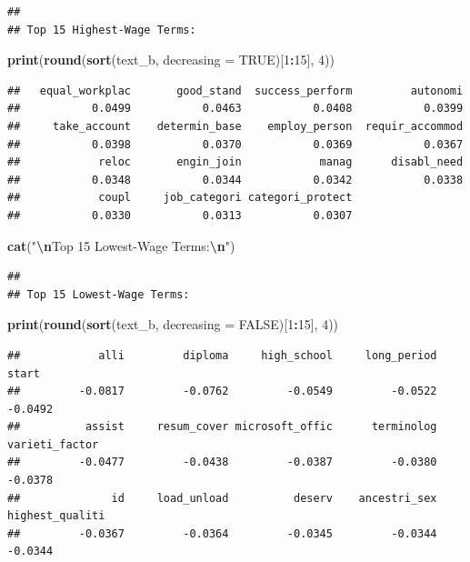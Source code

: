 \documentclass[
]{article}
\newenvironment{Shaded}{\begin{snugshade}}{\end{snugshade}}
\newcommand{\AttributeTok}[1]{\textcolor[rgb]{0.13,0.29,0.53}{#1}}
\newcommand{\ConstantTok}[1]{\textcolor[rgb]{0.56,0.35,0.01}{#1}}
\newcommand{\DecValTok}[1]{\textcolor[rgb]{0.00,0.00,0.81}{#1}}
\newcommand{\FunctionTok}[1]{\textcolor[rgb]{0.13,0.29,0.53}{\textbf{#1}}}
\newcommand{\NormalTok}[1]{#1}
\newcommand{\SpecialCharTok}[1]{\textcolor[rgb]{0.81,0.36,0.00}{\textbf{#1}}}
\newcommand{\StringTok}[1]{\textcolor[rgb]{0.31,0.60,0.02}{#1}}
\begin{document}
\begin{verbatim}
## 
## Top 15 Highest-Wage Terms:
\end{verbatim}

\begin{Shaded}
\begin{Highlighting}[]
\FunctionTok{print}\NormalTok{(}\FunctionTok{round}\NormalTok{(}\FunctionTok{sort}\NormalTok{(text\_b, }\AttributeTok{decreasing =} \ConstantTok{TRUE}\NormalTok{)[}\DecValTok{1}\SpecialCharTok{:}\DecValTok{15}\NormalTok{], }\DecValTok{4}\NormalTok{))}
\end{Highlighting}
\end{Shaded}

\begin{verbatim}
##   equal_workplac       good_stand  success_perform         autonomi 
##           0.0499           0.0463           0.0408           0.0399 
##     take_account    determin_base    employ_person  requir_accommod 
##           0.0398           0.0370           0.0369           0.0367 
##            reloc       engin_join            manag      disabl_need 
##           0.0348           0.0344           0.0342           0.0338 
##            coupl     job_categori categori_protect 
##           0.0330           0.0313           0.0307
\end{verbatim}

\begin{Shaded}
\begin{Highlighting}[]
\FunctionTok{cat}\NormalTok{(}\StringTok{"}\SpecialCharTok{\textbackslash{}n}\StringTok{Top 15 Lowest{-}Wage Terms:}\SpecialCharTok{\textbackslash{}n}\StringTok{"}\NormalTok{)}
\end{Highlighting}
\end{Shaded}

\begin{verbatim}
## 
## Top 15 Lowest-Wage Terms:
\end{verbatim}

\begin{Shaded}
\begin{Highlighting}[]
\FunctionTok{print}\NormalTok{(}\FunctionTok{round}\NormalTok{(}\FunctionTok{sort}\NormalTok{(text\_b, }\AttributeTok{decreasing =} \ConstantTok{FALSE}\NormalTok{)[}\DecValTok{1}\SpecialCharTok{:}\DecValTok{15}\NormalTok{], }\DecValTok{4}\NormalTok{))}
\end{Highlighting}
\end{Shaded}

\begin{verbatim}
##            alli         diploma     high_school     long_period           start 
##         -0.0817         -0.0762         -0.0549         -0.0522         -0.0492 
##          assist     resum_cover microsoft_offic      terminolog  varieti_factor 
##         -0.0477         -0.0438         -0.0387         -0.0380         -0.0378 
##              id     load_unload          deserv    ancestri_sex highest_qualiti 
##         -0.0367         -0.0364         -0.0345         -0.0344         -0.0344
\end{verbatim}
\end{document}
